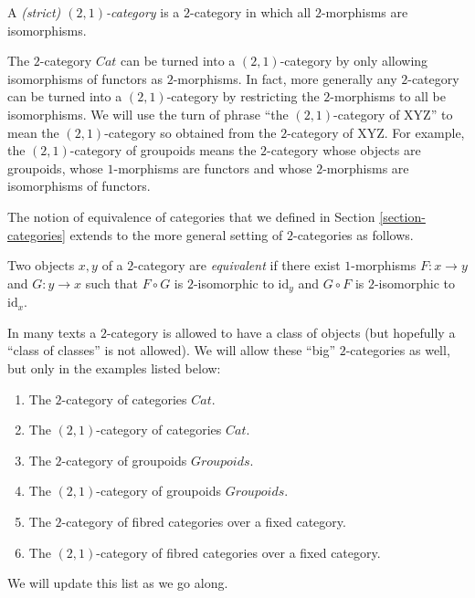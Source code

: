 \begin{definition}
\label{definition-2-1-category}
A {\it (strict) $(2,1)$-category} is a $2$-category in which all
$2$-morphisms are isomorphisms.
\end{definition}

\begin{example}
\label{example-2-1-category-of-categories}
The $2$-category $\textit{Cat}$ can be turned into a
$(2,1)$-category by only allowing isomorphisms of functors
as $2$-morphisms. In fact, more generally any $2$-category
can be turned into a $(2,1)$-category by restricting
the $2$-morphisms to all be isomorphisms. We will use the turn of phrase
``the $(2,1)$-category of XYZ'' to mean the $(2,1)$-category
so obtained from the $2$-category of XYZ. For example,
the $(2,1)$-category of groupoids means the
$2$-category whose objects are groupoids, whose
$1$-morphisms are functors and whose $2$-morphisms are
isomorphisms of functors.
\end{example}

\medskip\noindent
The notion of equivalence of categories that we defined in Section
\ref{section-categories} extends to the more general setting of
$2$-categories as follows.

\begin{definition}
\label{definition-equivalence}
Two objects $x,y$ of a $2$-category are {\it equivalent} if there exist 
$1$-morphisms $F : x \to y$ and $G : y \to x$ such that $F \circ G$ is 
$2$-isomorphic to $\text{id}_y$ and $G \circ F$ is $2$-isomorphic to 
$\text{id}_x$.
\end{definition}

\begin{remark} 
\label{remark-big-2-categories}
In many texts a $2$-category is allowed to have a class of
objects (but hopefully a ``class of classes'' is not allowed).
We will allow these ``big'' $2$-categories as well, but only
in the examples listed below:
\begin{enumerate}
\item The $2$-category of categories $\textit{Cat}$.
\item The $(2,1)$-category of categories $\textit{Cat}$.
\item The $2$-category of groupoids $\textit{Groupoids}$.
\item The $(2,1)$-category of groupoids $\textit{Groupoids}$.
\item The $2$-category of fibred categories over a fixed category.
\item The $(2,1)$-category of fibred categories over a fixed category.
\end{enumerate}
We will update this list as we go along.
\end{remark}

